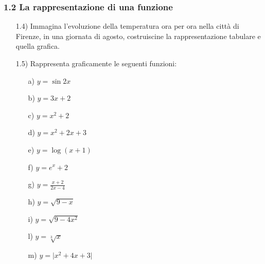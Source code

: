 \subsubsection*{1.2 La rappresentazione di una funzione}
\begin{itemize}
  \item[1.4)] Immagina l'evoluzione della temperatura ora per ora nella 
città di Firenze, in una giornata di agosto, costruiscine la rappresentazione 
tabulare e quella grafica.
  \item[1.5)] Rappresenta graficamente le seguenti funzioni:
  \begin{itemize}
  \item[a)] \(y=\sin2x\)
  \item[b)] \(y=3x+2\)
  \item[c)] \(y=x^2+2\)
  \item[d)] \(y=x^2+2x+3\)
  \item[e)] \(y=\log{(x+1)}\)
  \item[f)] \(y=e^x+2\)
  \item[g)] \(y=\frac{x+2}{2x-4}\)
  \item[h)] \(y=\sqrt{9-x}\)
  \item[i)] \(y=\sqrt{9-4x^2}\)
  \item[l)] \(y=\sqrt[3]{x}\)
  \item[m)] \(y=\vert x^2+4x+3\vert\)
  \end{itemize}
\end{itemize}

